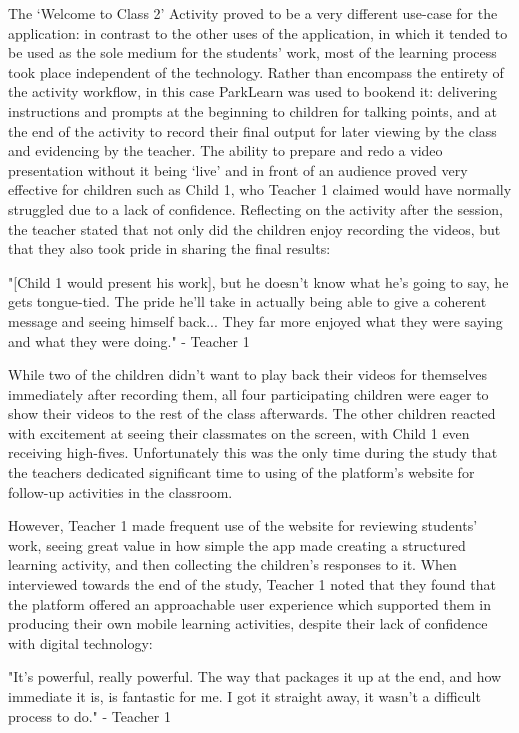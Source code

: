 The `Welcome to Class 2' Activity proved to be a very different use-case for the application: in contrast to the other uses of the application, in which it tended to be used as the sole medium for the students' work, most of the learning process took place independent of the technology. Rather than encompass the entirety of the activity workflow, in this case ParkLearn was used to bookend it: delivering instructions and prompts at the beginning to children for talking points, and at the end of the activity to record their final output for later viewing by the class and evidencing by the teacher. The ability to prepare and redo a video presentation without it being `live' and in front of an audience proved very effective for children such as Child 1, who Teacher 1 claimed would have normally struggled due to a lack of confidence. Reflecting on the activity after the session, the teacher stated that not only did the children enjoy recording the videos, but that they also took pride in sharing the final results: 

\begin{displayquote}
"[Child 1 would present his work], but he doesn't know what he’s going to say, he gets tongue-tied. The pride he’ll take in actually being able to give a coherent message and seeing himself back... They far more enjoyed what they were saying and what they were doing." - Teacher 1
\end{displayquote}

While two of the children didn’t want to play back their videos for themselves immediately after recording them, all four participating children were eager to show their videos to the rest of the class afterwards. The other children reacted with excitement at seeing their classmates on the screen, with Child 1 even receiving high-fives. Unfortunately this was the only time during the study that the teachers dedicated significant time to using of the platform's website for follow-up activities in the classroom.

However, Teacher 1 made frequent use of the website for reviewing students' work, seeing great value in how simple the app made creating a structured learning activity, and then collecting the children’s responses to it. When interviewed towards the end of the study, Teacher 1 noted that they found that the platform offered an approachable user experience which supported them in producing their own mobile learning activities, despite their lack of confidence with digital technology:

\begin{displayquote}
"It’s powerful, really powerful. The way that packages it up at the end, and how immediate it is, is fantastic for me. I got it straight away, it wasn't a difficult process to do." - Teacher 1
\end{displayquote}

